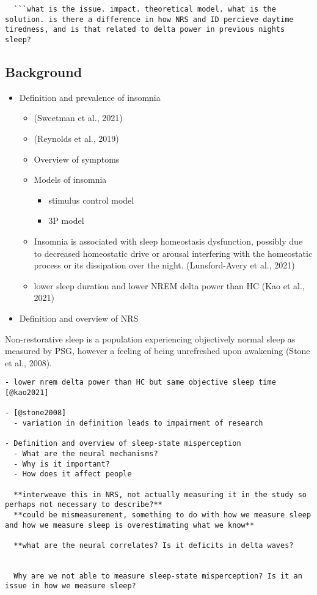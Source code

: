 \documentclass[
]{article}
\providecommand{\tightlist}{%
  \setlength{\itemsep}{0pt}\setlength{\parskip}{0pt}}
\begin{document}
\begin{verbatim}
  ```what is the issue. impact. theoretical model. what is the solution. is there a difference in how NRS and ID percieve daytime tiredness, and is that related to delta power in previous nights sleep?
\end{verbatim}

\subsection{Background}\label{background}

\begin{itemize}
\tightlist
\item
  Definition and prevalence of insomnia

  \begin{itemize}
  \item
    (Sweetman et al., 2021)
  \item
    (Reynolds et al., 2019)
  \item
    Overview of symptoms
  \item
    Models of insomnia

    \begin{itemize}
    \tightlist
    \item
      stimulus control model
    \item
      3P model
    \end{itemize}
  \item
    Insomnia is associated with sleep homeostasis dysfunction, possibly
    due to decreased homeostatic drive or arousal interfering with the
    homeostatic process or its dissipation over the night.
    (Lunsford-Avery et al., 2021)
  \item
    lower sleep duration and lower NREM delta power than HC (Kao et al.,
    2021)
  \end{itemize}
\item
  Definition and overview of NRS
\end{itemize}

Non-restorative sleep is a population experiencing objectively normal
sleep as measured by PSG, however a feeling of being unrefreshed upon
awakening (Stone et al., 2008).

\begin{verbatim}
- lower nrem delta power than HC but same objective sleep time [@kao2021]

- [@stone2008]
  - variation in definition leads to impairment of research

- Definition and overview of sleep-state misperception
  - What are the neural mechanisms?
  - Why is it important? 
  - How does it affect people
  
  **interweave this in NRS, not actually measuring it in the study so perhaps not necessary to describe?**
  **could be mismeasurement, something to do with how we measure sleep and how we measure sleep is overestimating what we know**
  
  **what are the neural correlates? Is it deficits in delta waves? 


  Why are we not able to measure sleep-state misperception? Is it an issue in how we measure sleep?
\end{verbatim}
\end{document}
